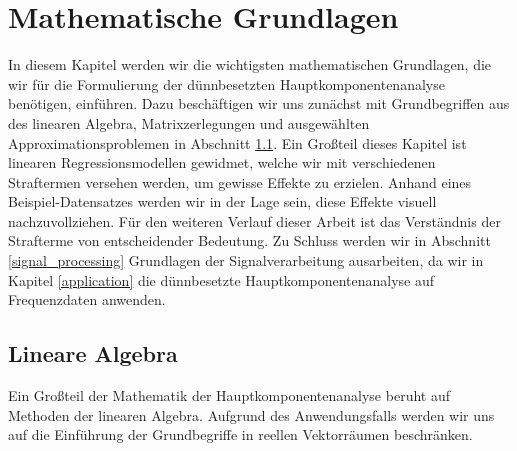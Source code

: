 \chapter{Mathematische Grundlagen}

\label{fundamentals}

In diesem Kapitel werden wir die wichtigsten mathematischen Grundlagen, die wir für die Formulierung der dünnbesetzten Hauptkomponentenanalyse benötigen, einführen. Dazu beschäftigen wir uns zunächst mit Grundbegriffen aus des linearen Algebra, Matrixzerlegungen und ausgewählten Approximationsproblemen in Abschnitt \ref{linear_algebra}. Ein Großteil dieses Kapitel ist linearen Regressionsmodellen gewidmet, welche wir mit verschiedenen Straftermen versehen werden, um gewisse Effekte zu erzielen. Anhand eines Beispiel-Datensatzes werden wir in der Lage sein, diese Effekte visuell nachzuvollziehen. Für den weiteren Verlauf dieser Arbeit ist das Verständnis der Strafterme von entscheidender Bedeutung. Zu Schluss werden wir in Abschnitt \ref{signal_processing} Grundlagen der Signalverarbeitung ausarbeiten, da wir in Kapitel \ref{application} die dünnbesetzte Hauptkomponentenanalyse auf Frequenzdaten anwenden.






\section{Lineare Algebra}
\label{linear_algebra}

Ein Großteil der Mathematik der Hauptkomponentenanalyse beruht auf Methoden der linearen Algebra. Aufgrund des Anwendungsfalls werden wir uns auf die Einführung der Grundbegriffe in reellen Vektorräumen beschränken.

